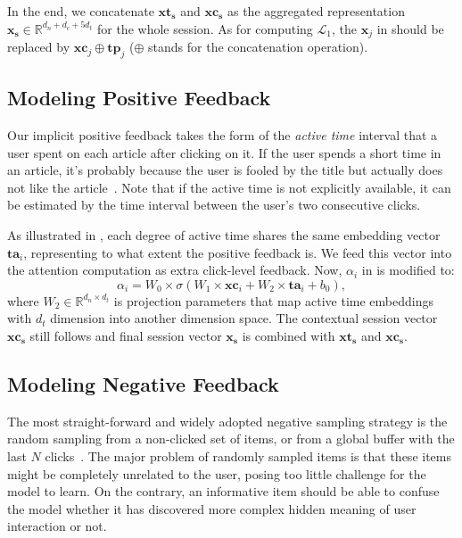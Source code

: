 In the end, we concatenate $\mathbf{xt_s}$ and $\mathbf{xc_s}$ as the aggregated representation $\mathbf{x_s} \in \mathbb{R}^{d_n+d_c+5d_t} $ for the whole session. As for computing $\mathcal{L}_1$, the $\mathbf{x}_j$ in  should be replaced by $\mathbf{xc}_j \oplus \mathbf{tp}_j$ ($\oplus$ stands for the concatenation operation).

\subsection{Modeling Positive Feedback}
\label{sec:positive feedback}
Our implicit positive feedback takes the form of the \textit{active time} interval that 
a user spent on each article after clicking on it. If the user spends a short time 
in an article, it's probably because the user is fooled by the title but actually does not like 
the article~\cite{lu_quality_2019}. Note that if the active time is not explicitly available, 
it can be estimated by the time interval between the user's two consecutive clicks. 

As illustrated in , each degree of active time shares the same embedding vector $\mathbf{ta}_i$, representing to what extent the positive feedback is. We feed this vector into the attention computation as extra click-level 
feedback. Now, $\alpha_i$ in  is modified to:
\begin{equation}
    \alpha_i = W_0 \times \sigma (W_1 \times \mathbf{xc}_i + W_2 \times \mathbf{ta}_i + b_0),
\end{equation}
where $W_2 \in \mathbb{R}^{d_n \times d_t}$ is projection parameters that map active time embeddings with $d_t$ dimension into another dimension space. The contextual session vector $\mathbf{xc_s}$ still follows
 and final session vector $\mathbf{x_s}$ is combined with $\mathbf{xt_s}$ and $\mathbf{xc_s}$.

\subsection{Modeling Negative Feedback}
\label{sec:negative feedback}
The most straight-forward and widely adopted negative sampling strategy is the random sampling 
from a non-clicked set of items, or from a global buffer with the last $N$ 
clicks~\cite{gabriel2019contextual}. 
The major problem of randomly sampled items is that these items might be completely unrelated to 
the user, posing too little challenge for the model to learn. On the contrary, an informative item should be able to confuse the model whether it has discovered more complex hidden meaning of user interaction or not.

